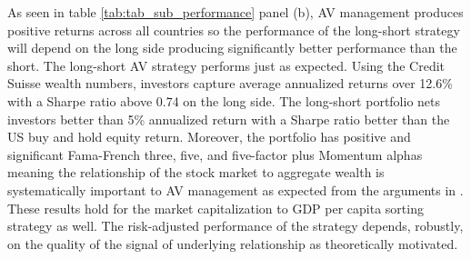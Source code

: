 As seen in table \ref{tab:tab_sub_performance} panel (b), AV management produces positive returns across all countries so the performance of the long-short strategy will depend on the long side producing significantly better performance than the short. The long-short AV strategy performs just as expected. Using the Credit Suisse wealth numbers, investors capture average annualized returns over 12.6\% with a Sharpe ratio above 0.74 on the long side. %
The long-short portfolio nets investors better than 5\% annualized return with a Sharpe ratio better than the US buy and hold equity return. Moreover, the portfolio has positive and significant Fama-French three, five, and five-factor plus Momentum alphas meaning the relationship of the stock market to aggregate wealth is systematically important to AV management as expected from the arguments in \citet{pollet_average_2010}. These results hold for the market capitalization to GDP per capita sorting strategy as well. The risk-adjusted performance of the strategy depends, robustly, on the quality of the signal of underlying relationship as theoretically motivated.

